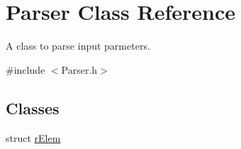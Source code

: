 \hypertarget{classParser}{}\section{Parser Class Reference}
\label{classParser}


A class to parse input parmeters.  




{\ttfamily \#include $<$Parser.\+h$>$}

\subsection*{Classes}
\begin{DoxyCompactItemize}
\item 
struct \hyperlink{structParser_1_1rElem}{r\+Elem}
\end{DoxyCompactItemize}
